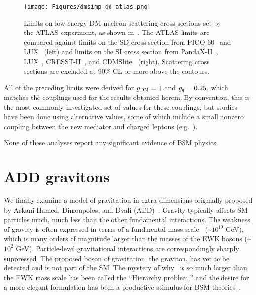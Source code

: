 \begin{figure}[hbtb]
  \begin{center}
    \texttt{[image: Figures/dmsimp\_dd\_atlas.png]}
    \caption{Limits on low-energy DM-nucleon scattering cross sections set by the ATLAS experiment, as shown in~\cite{ref:epjc/s10052-017-4965-8}. The ATLAS
    limits are compared against limits on the SD cross section from PICO-60~\cite{ref:PICO60-ATLAS} and LUX~\cite{ref:LUX-SD-ATLAS} (left)
    and limits on the SI cross section from PandaX-II~\cite{ref:PANDAX-II-ATLAS}, LUX~\cite{ref:LUX-SI-ATLAS}, CRESST-II~\cite{ref:CRESST-II-ATLAS}, and CDMSlite~\cite{ref:SuperCDMS-ATLAS} (right).
    Scattering cross sections are excluded at 90\% CL or more above the contours.
    }
    \label{fig:dmsimp_dd_atlas}
  \end{center}
\end{figure}

All of the preceding limits were derived for $g_\mathrm{DM} = 1$ and $g_\mathrm{q} = 0.25$, which matches the couplings used for the results obtained herein.
By convention, this is the most commonly investigated set of values for these couplings, but studies have been done using alternative values, some of which
include a small nonzero coupling between the new mediator and charged leptons (e.g.~\cite{ref:epjc/s10052-017-4965-8}).

None of these analyses report any significant evidence of BSM physics.

\section{ADD gravitons} \label{sec:introduction_ADD}
We finally examine a model of gravitation in extra dimensions originally proposed by Arkani-Hamed, Dimoupolos, and Dvali (ADD)~\cite{ref:S0370-2693(98)00466-3}.
Gravity typically affects SM particles much, much less than the other fundamental interactions. The weakness of gravity
is often expressed in terms of a fundmental mass scale \mPl\ (\textasciitilde$10^{19}$ GeV), which is
many orders of magnitude larger than the masses of the EWK bosons (\textasciitilde$10^{2}$ GeV). Particle-level gravitational interactions
are correspondingly sharply suppressed. The proposed boson of gravitation, the graviton, has yet to be detected and is not part of the SM.
The mystery of why \mPl\ is so much larger than the EWK mass scale has been called the ``Hierarchy problem,'' and the desire for a
more elegant formulation has been a productive stimulus for BSM theories~\cite{ref:S0370-2693(98)00466-3, ref:0264-9381/32/3/033001}.

